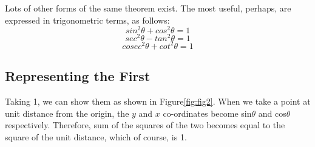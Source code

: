 Lots of other forms of the same theorem exist. The most useful, perhaps, are
expressed in trigonometric terms, as follows:
\begin{equation}
    sin^2\theta+cos^2\theta=1
\end{equation}
\begin{equation}
    sec^2\theta-tan^2\theta=1
\end{equation}
\begin{equation}
    cosec^2\theta+cot^2\theta=1
\end{equation}

\subsection{Representing the First}
Taking 1, we can show them as shown in Figure\ref{fig:fig2}. When we take a point at
unit distance from the origin, the $y$ and $x$ co-ordinates become sin$\theta$ and cos$\theta$
respectively. Therefore, sum of the squares of the two becomes equal to the
square of the unit distance, which of course, is 1.